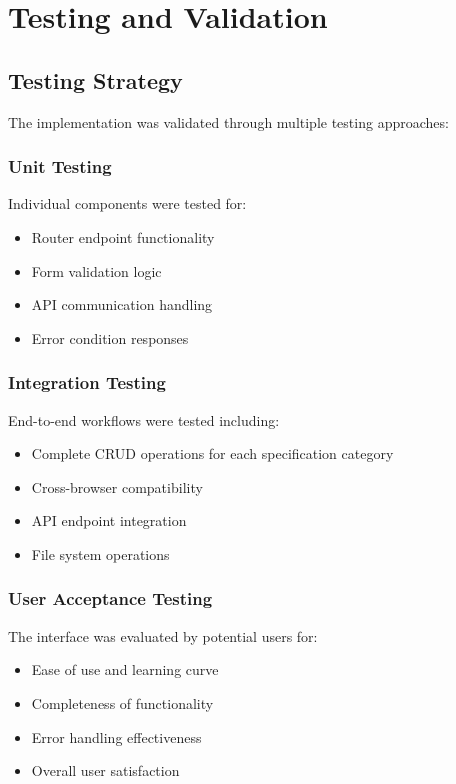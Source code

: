 \documentclass[11pt,a4paper]{article}
\begin{document}
\section{Testing and Validation}

\subsection{Testing Strategy}

The implementation was validated through multiple testing approaches:

\subsubsection{Unit Testing}
Individual components were tested for:
\begin{itemize}
    \item Router endpoint functionality
    \item Form validation logic
    \item API communication handling
    \item Error condition responses
\end{itemize}

\subsubsection{Integration Testing}
End-to-end workflows were tested including:
\begin{itemize}
    \item Complete CRUD operations for each specification category
    \item Cross-browser compatibility
    \item API endpoint integration
    \item File system operations
\end{itemize}

\subsubsection{User Acceptance Testing}
The interface was evaluated by potential users for:
\begin{itemize}
    \item Ease of use and learning curve
    \item Completeness of functionality
    \item Error handling effectiveness
    \item Overall user satisfaction
\end{itemize}
\end{document}
